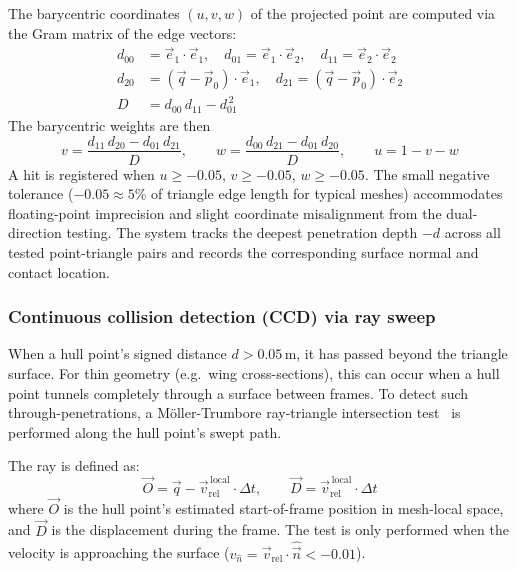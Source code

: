 \documentclass[Orbiter Technical Reference.tex]{subfiles}
\begin{document}
The barycentric coordinates $(u, v, w)$ of the projected point are computed
via the Gram matrix of the edge vectors:
\begin{equation}
\begin{aligned}
d_{00} &= \vec{e}_1 \cdot \vec{e}_1, \quad
d_{01} = \vec{e}_1 \cdot \vec{e}_2, \quad
d_{11} = \vec{e}_2 \cdot \vec{e}_2 \\[4pt]
d_{20} &= (\vec{q} - \vec{p}_0) \cdot \vec{e}_1, \quad
d_{21} = (\vec{q} - \vec{p}_0) \cdot \vec{e}_2 \\[4pt]
D &= d_{00}\,d_{11} - d_{01}^{\,2}
\end{aligned}
\label{eq:gram}
\end{equation}
The barycentric weights are then
\begin{equation}
v = \frac{d_{11}\,d_{20} - d_{01}\,d_{21}}{D}, \qquad
w = \frac{d_{00}\,d_{21} - d_{01}\,d_{20}}{D}, \qquad
u = 1 - v - w
\label{eq:bary}
\end{equation}
A hit is registered when $u \ge -0.05$, $v \ge -0.05$, $w \ge -0.05$.
The small negative tolerance ($-0.05 \approx 5$\% of triangle edge length for
typical meshes) accommodates floating-point imprecision and slight
coordinate misalignment from the dual-direction testing.
The system tracks the deepest penetration depth $-d$ across all tested
point-triangle pairs and records the corresponding surface normal and
contact location.


\subsubsection{Continuous collision detection (CCD) via ray sweep}
\label{sssec:ccd}
When a hull point's signed distance $d > 0.05$\,m, it has passed beyond
the triangle surface.  For thin geometry (e.g.\ wing cross-sections), this
can occur when a hull point tunnels completely through a surface between
frames.  To detect such through-penetrations, a M\"oller-Trumbore
ray-triangle intersection test~\cite{moller1997} is performed along the
hull point's swept path.

The ray is defined as:
\begin{equation*}
\vec{O} = \vec{q} - \vec{v}_{\mathrm{rel}}^{\,\mathrm{local}} \cdot \Delta t, \qquad
\vec{D} = \vec{v}_{\mathrm{rel}}^{\,\mathrm{local}} \cdot \Delta t
\end{equation*}
where $\vec{O}$ is the hull point's estimated start-of-frame position in
mesh-local space, and $\vec{D}$ is the displacement during the frame.
The test is only performed when the velocity is approaching the surface
($v_{\hat{n}} = \vec{v}_{\mathrm{rel}} \cdot \hat{\vec{n}} < -0.01$).
\end{document}
